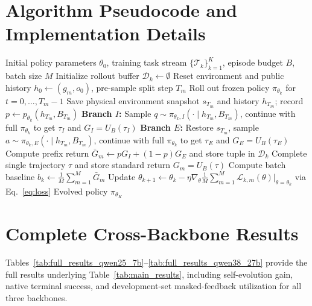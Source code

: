 \documentclass[11pt]{article}
\theoremstyle{definition}
\theoremstyle{remark}
\newcommand{\prism}{\textsc{SPAR}}
\newcommand{\UB}{U_B}
\begin{document}
\section{Algorithm Pseudocode and Implementation Details}
\label{app:algorithm}

\begin{algorithm}[h!]
\caption{\prism{} Cross-Task Self-Evolution Training Loop}
\label{alg:prism_evolve}
\begin{algorithmic}[1]
\Require Initial policy parameters $\theta_0$, training task stream $\{\mathcal{T}_k\}_{k=1}^K$, episode budget $B$, batch size $M$
    \State Initialize rollout buffer $\mathcal{D}_k \gets \emptyset$
        \State Reset environment and public history $h_0 \gets (g_m, o_0)$, pre-sample split step $T_m$
        \State Roll out frozen policy $\pi_{\theta_k}$ for $t = 0, \dots, T_m - 1$
            \State Save physical environment snapshot $s_{T_m}$ and history $h_{T_m}$; record $p \gets p_{\theta_k}(h_{T_m}, B_{T_m})$
            \State \textbf{Branch $I$:} Sample $q \sim \pi_{\theta_k, I}(\cdot \mid h_{T_m}, B_{T_m})$, continue with full $\pi_{\theta_k}$ to get $\tau_I$ and $G_I = \UB(\tau_I)$
            \State \textbf{Branch $E$:} Restore $s_{T_m}$, sample $a \sim \pi_{\theta_k, E}(\cdot \mid h_{T_m}, B_{T_m})$, continue with full $\pi_{\theta_k}$ to get $\tau_E$ and $G_E = \UB(\tau_E)$
            \State Compute prefix return $\bar{G}_m \gets p G_I + (1 - p) G_E$ and store tuple in $\mathcal{D}_k$
        \Else
            \State Complete single trajectory $\tau$ and store standard return $G_m = \UB(\tau)$
        \EndIf
    \EndFor
    \State Compute batch baseline $b_k \gets \frac{1}{M}\sum_{m=1}^M \bar{G}_m$
    \State Update $\theta_{k+1} \gets \theta_k - \eta \nabla_\theta \frac{1}{M}\sum_{m=1}^M \mathcal{L}_{k,m}(\theta)\big|_{\theta=\theta_k}$ via Eq.~\eqref{eq:loss}
\EndFor
\State \Return Evolved policy $\pi_{\theta_K}$
\end{algorithmic}
\end{algorithm}

\clearpage
\section{Complete Cross-Backbone Results}
\label{app:full_results}
Tables~\ref{tab:full_results_qwen25_7b}--\ref{tab:full_results_qwen38_27b} provide the full results underlying Table~\ref{tab:main_results}, including self-evolution gain, native terminal success, and development-set masked-feedback utilization for all three backbones.



\end{document}
